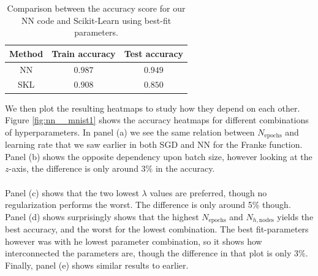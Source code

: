 \documentclass[a4paper]{article}
\newcommand{\Nepochs}{N_{\text{epochs}}}
\newcommand{\Nhn}{N_{h,\text{nodes}}}
\begin{document}
\begin{table}[H]
  \centering
  \caption{Comparison between the accuracy score for our NN code and Scikit-Learn using best-fit parameters.}
  \label{tab:nn_mnist_accuracy}
  \begin{tabular}{c|c|c}
    \hline\hline
    Method & Train accuracy & Test accuracy\\\hline
	NN & $0.987$ & $0.949$\\
	SKL & $0.908$ & $0.850$
    \end{tabular}
\end{table}
We then plot the resulting heatmaps to study how they depend on each other. Figure \ref{fig:nn__mnist1} shows the accuracy heatmaps for different combinations of hyperparameters. In panel (a) we see the same relation between $\Nepochs$ and learning rate that we saw earlier in both SGD and NN for the Franke function. Panel (b) shows the opposite dependency upon batch size, however looking at the $z$-axis, the difference is only around $3$\% in the accuracy. 
\\\\
Panel (c) shows that the two lowest $\lambda$ values are preferred, though no regularization performs the worst. The difference is only around 5\% though. Panel (d) shows surprisingly shows that the highest $\Nepochs$ and $\Nhn$ yields the best accuracy, and the worst for the lowest combination. The best fit-parameters however was with he lowest parameter combination, so it shows how interconnected the parameters are, though the difference in that plot is only 3\%. Finally, panel (e) shows similar results to earlier.
\end{document}
